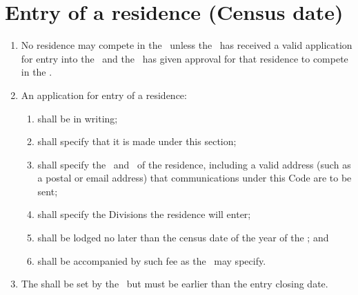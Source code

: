 \documentclass[12pt]{report}
\begin{document}
  \section{Entry of a residence (Census date)}\label{sec:entryresidence}
  \begin{enumerate}
    \item No residence may compete in the \Event\ unless the \RaceDirector\ has received a valid application for entry into the \Event\ and the \RaceDirector\ has given approval for that residence to compete in the \Event.
    \item An application for entry of a residence:
    \begin{enumerate}
        \item shall be in writing;
      \item shall specify that it is made under this section;
      \item shall specify the \Coach\ and \President\ of the residence, including a valid address (such as a postal or email address) that communications under this Code are to be sent;\label{enum:CoachEmail}
      \item shall specify the Divisions the residence will enter;\label{sec:CensusDivision}

      \item shall be lodged no later than the census date of the year of the \Event; and
      \item shall be accompanied by such fee as the \RaceDirector\ may specify.\amended
    \end{enumerate}
    \item The  shall be set by the \RaceDirector\ but must be earlier than the entry closing date.
  \end{enumerate}
\end{document}
